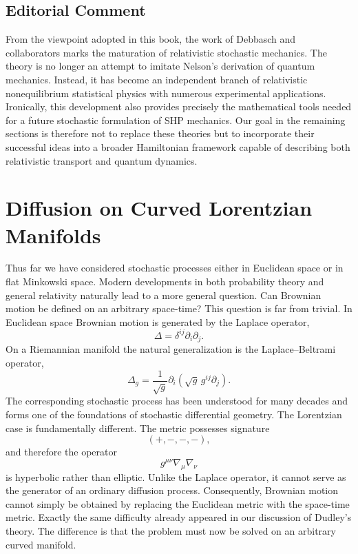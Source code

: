 \subsection*{Editorial Comment}
From the viewpoint adopted in this book, the work of Debbasch and
collaborators marks the maturation of relativistic stochastic
mechanics.
The theory is no longer an attempt to imitate Nelson's derivation of
quantum mechanics.
Instead, it has become an independent branch of relativistic
nonequilibrium statistical physics with numerous experimental
applications.
Ironically, this development also provides precisely the mathematical
tools needed for a future stochastic formulation of SHP mechanics.
Our goal in the remaining sections is therefore not to replace these
theories but to incorporate their successful ideas into a broader
Hamiltonian framework capable of describing both relativistic transport
and quantum dynamics.
\section{Diffusion on Curved Lorentzian Manifolds}
\label{sec:CurvedDiffusion}
Thus far we have considered stochastic processes either in Euclidean
space or in flat Minkowski space. Modern developments in both
probability theory and general relativity naturally lead to a more
general question.
Can Brownian motion be defined on an arbitrary space-time?
This question is far from trivial.
In Euclidean space Brownian motion is generated by the Laplace operator,
\[\Delta=\delta^{ij}\partial_i\partial_j.\]
On a Riemannian manifold the natural generalization is the
Laplace--Beltrami operator,
\begin{equation}
\Delta_g=\frac{1}{\sqrt g}\partial_i\left(\sqrt g\,g^{ij}\partial_j\right).
\label{eq:LaplaceBeltrami}
\end{equation}
The corresponding stochastic process has been understood for many
decades and forms one of the foundations of stochastic differential
geometry.
The Lorentzian case is fundamentally different.
The metric possesses signature
\[(+,-,-,-),\]
and therefore the operator
\[g^{\mu\nu}\nabla_\mu\nabla_\nu\]
is hyperbolic rather than elliptic.
Unlike the Laplace operator,
it cannot serve as the generator of an ordinary diffusion process.
Consequently,
Brownian motion cannot simply be obtained by replacing the Euclidean
metric with the space-time metric.
Exactly the same difficulty already appeared in our discussion of
Dudley's theory.
The difference is that the problem must now be solved on an arbitrary
curved manifold.

